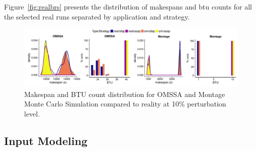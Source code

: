 \documentclass[10pt,conference,compsocconf]{IEEEtran}
\begin{document}
Figure~\ref{fig:realbrs}  presents the  distribution of  makespans and  \ac{btu}
counts for  all the selected  real runs  separated by application  and strategy.

\begin{figure}
	\includegraphics[width=\textwidth]{gfx/fit_plot.pdf}
	\caption{Makespan and BTU count distribution for OMSSA and Montage Monte
	Carlo Simulation compared to reality at 10\% perturbation
	level.}\label{fig:fit}
\end{figure}



\subsection{Input Modeling}\label{sec:im}
\end{document}
